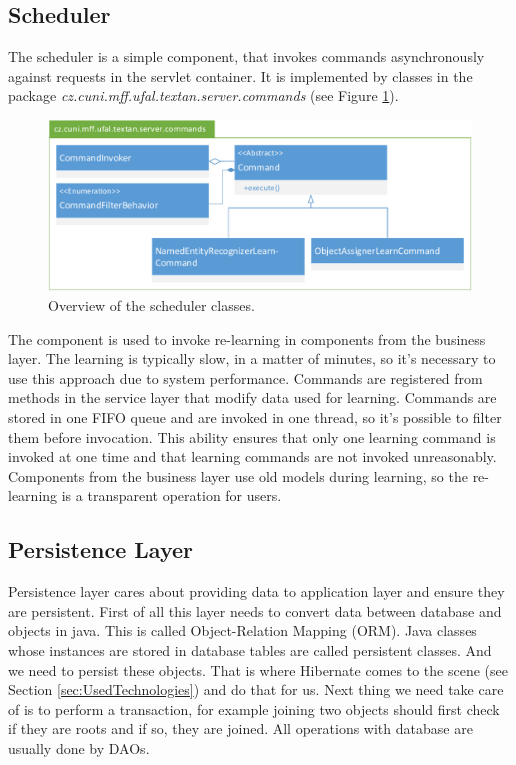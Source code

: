 \subsection{Scheduler}
The scheduler is a simple component, that invokes commands asynchronously against
requests in the servlet container. It is implemented by classes in the package
\emph{cz.\-cuni.\-mff.\-ufal.\-textan.\-server.\-commands} (see Figure
\ref{fig:CommandsOverview}).

\begin{figure}[!htb]
        \centering
        \includegraphics[width=\textwidth]{Images/Commands}
        \caption{Overview of the scheduler classes.}
        \label{fig:CommandsOverview}
\end{figure}

The component is used to invoke re-learning in components from the business layer.
The learning is typically slow, in a matter of minutes, so it's necessary to use
this approach due to system performance. Commands are registered from methods in
the service layer that modify data used for learning. Commands are stored in one
FIFO queue and are invoked in one thread, so it's possible to filter them before
invocation. This ability ensures that only one learning command is invoked at one
time and that learning commands are not invoked unreasonably. Components from
the business layer use old models during learning, so the re-learning is a transparent
operation for users.

\subsection{Persistence Layer}
\label{sec:PersistentLayer}


Persistence layer cares about providing data to application layer and ensure they
are persistent. First of all this layer needs to convert data between database and
objects in java. This is called Object-Relation Mapping (ORM). Java classes whose
instances are stored in database tables are called persistent classes. And we need
to persist these objects. That is where Hibernate comes to the scene (see Section
\ref{sec:UsedTechnologies}) and do that for us. Next thing we need take care of is
to perform a transaction, for example joining two objects should first check if
they are roots and if so, they are joined. All operations with database are usually
done by DAOs.

